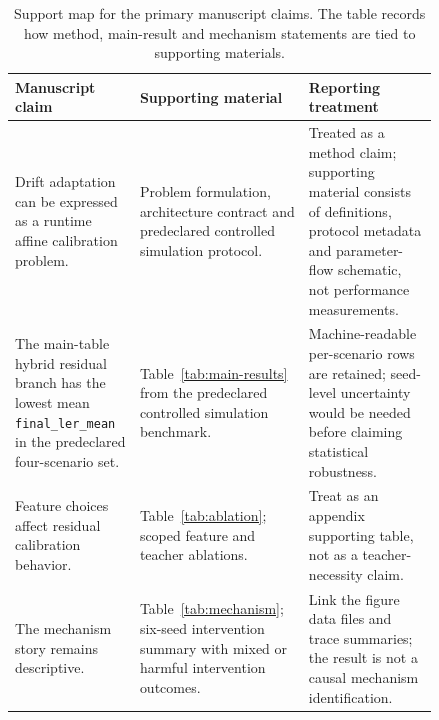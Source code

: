\documentclass[11pt]{article}
\newcommand{\softwarehil}{controlled simulation}
\newcommand{\finalLER}{\texttt{final\_ler\_mean}}
\begin{document}
\begin{table}[htbp]
\centering
\small
\begin{tabular}{@{}>{\raggedright\arraybackslash}p{0.27\linewidth}>{\raggedright\arraybackslash}p{0.28\linewidth}>{\raggedright\arraybackslash}p{0.29\linewidth}@{}}
\toprule
Manuscript claim & Supporting material & Reporting treatment \\
\midrule
Drift adaptation can be expressed as a runtime affine calibration problem. &
Problem formulation, architecture contract and predeclared \softwarehil{} protocol. &
Treated as a method claim; supporting material consists of definitions, protocol metadata and
parameter-flow schematic, not performance measurements. \\
\addlinespace
The main-table hybrid residual branch has the lowest mean \finalLER{} in
the predeclared four-scenario set.
& Table~\ref{tab:main-results} from the predeclared \softwarehil{} benchmark. &
Machine-readable per-scenario rows are retained; seed-level uncertainty would
be needed before claiming statistical robustness. \\
\addlinespace
Feature choices affect residual calibration behavior. &
Table~\ref{tab:ablation}; scoped feature and teacher ablations. & Treat as an
appendix supporting table, not as a teacher-necessity claim.
\\
\addlinespace
The mechanism story remains descriptive. & Table~\ref{tab:mechanism}; six-seed
intervention summary with mixed or harmful intervention outcomes. & Link the
figure data files and trace summaries; the result is not a causal mechanism
identification.
\\
\bottomrule
\end{tabular}
\caption{Support map for the primary manuscript claims.  The table records
how method, main-result and mechanism statements are tied to supporting
materials.}
\label{tab:claim-support-primary}
\end{table}
\end{document}
